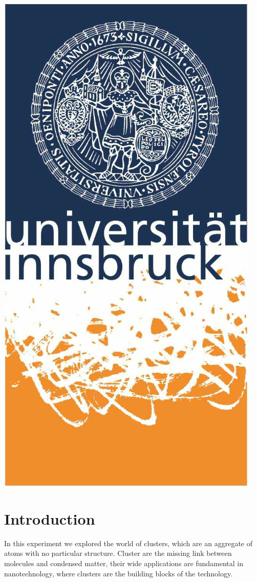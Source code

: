 \documentclass[a4paper,10pt]{article}
\begin{document}
\begin{titlepage}
	\begin{center}
	\includegraphics[scale=0.56]{img/uibk}
	\end{center}

\end{titlepage}


\section{Introduction}
In this experiment we explored the world of clusters, which are an aggregate of atoms with no particular structure. Cluster are the missing link between molecules and condensed matter, their wide applications are fundamental in nanotechnology, where clusters are the building blocks of the technology.
\end{document}
